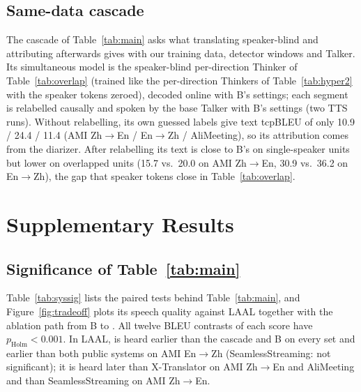 \ifCascade
\subsection{Same-data cascade}
\label{app:cascade}
The cascade of Table~\ref{tab:main} asks what translating speaker-blind and attributing afterwards gives with our
training data, detector windows and Talker. Its simultaneous model is the speaker-blind per-direction Thinker of
Table~\ref{tab:overlap} (trained like the per-direction Thinkers of Table~\ref{tab:hyper2} with the speaker tokens
zeroed), decoded online with B's settings; each segment is relabelled causally and spoken by the base Talker with B's
settings (two TTS runs). Without relabelling, its own guessed labels give text tcpBLEU of only 10.9 / 24.4 / 11.4 (AMI
Zh$\rightarrow$En / En$\rightarrow$Zh / AliMeeting), so its attribution comes from the diarizer. After relabelling its
text is close to B's on single-speaker units but lower on overlapped units (15.7 vs.\ 20.0 on AMI Zh$\rightarrow$En,
30.9 vs.\ 36.2 on En$\rightarrow$Zh), the gap that speaker tokens close in Table~\ref{tab:overlap}.
\fi

\section{Supplementary Results}
\label{app:more}
\label{app:sig10}
\label{app:postreview}

\subsection{Significance of Table~\ref{tab:main}}
Table~\ref{tab:syssig} lists the paired tests behind Table~\ref{tab:main}, and Figure~\ref{fig:tradeoff} plots its
speech quality against LAAL together with the ablation path from B to \sys{}. All twelve BLEU contrasts of each score have
$p_\text{Holm}<0.001$. In LAAL, \sys{} is heard earlier than the cascade and B on every set and earlier than both public systems on
AMI En$\rightarrow$Zh (SeamlessStreaming: not significant); it is heard later than X-Translator on AMI
Zh$\rightarrow$En and AliMeeting and than SeamlessStreaming on AMI Zh$\rightarrow$En.



